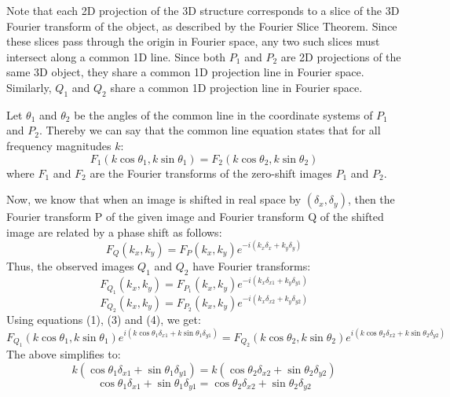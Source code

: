 \documentclass{article}
\begin{document}
\begin{enumerate}
Note that each 2D projection of the 3D structure corresponds to a slice of the 3D Fourier transform of the object, as described by the Fourier Slice Theorem. Since these slices pass through the origin in Fourier space, any two such slices must intersect along a common 1D line.
Since both $P_1$ and $P_2$ are 2D projections of the same 3D object, they share a common 1D projection line in Fourier space. Similarly, $Q_1$ and $Q_2$ share a common 1D projection line in Fourier space.


Let $\theta_1$ and $\theta_2$ be the angles of the common line in the coordinate systems of $P_1$ and $P_2$. Thereby we can say that the common line equation states that for all frequency magnitudes $k$:
\begin{equation}
    F_1(k \cos\theta_1, k \sin\theta_1) = F_2(k \cos\theta_2, k \sin\theta_2)
\end{equation}
where $F_1$ and $F_2$ are the Fourier transforms of the zero-shift images $P_1$ and $P_2$.

Now, we know that when an image is shifted in real space by $(\delta_x, \delta_y)$, then the Fourier transform P of the given image and Fourier transform Q of the shifted image are related by a phase shift as follows:
\begin{equation}
    F_Q(k_x, k_y) = F_P(k_x, k_y) e^{-i( k_x \delta_x + k_y \delta_y )}
\end{equation}
Thus, the observed images $Q_1$ and $Q_2$ have Fourier transforms:
\begin{equation}
    F_{Q_1}(k_x, k_y) = F_{P_1}(k_x, k_y) e^{-i (k_x \delta_{x1} + k_y \delta_{y1})}
\end{equation}
\begin{equation}
    F_{Q_2}(k_x, k_y) = F_{P_2}(k_x, k_y) e^{-i (k_x \delta_{x2} + k_y \delta_{y2})}
\end{equation}
Using equations (1), (3) and (4), we get:
\begin{equation}
    F_{Q_1}(k \cos\theta_1, k \sin\theta_1) e^{i ( k \cos\theta_1 \delta_{x1} + k \sin\theta_1 \delta_{y1} )} =
    F_{Q_2}(k \cos\theta_2, k \sin\theta_2) e^{i ( k \cos\theta_2 \delta_{x2} + k \sin\theta_2 \delta_{y2} )}
\end{equation}
The above simplifies to:
\begin{equation}
    k (\cos\theta_1 \delta_{x1} + \sin\theta_1 \delta_{y1}) = k (\cos\theta_2 \delta_{x2} + \sin\theta_2 \delta_{y2})
\end{equation}
\begin{equation}
    \cos\theta_1 \delta_{x1} + \sin\theta_1 \delta_{y1} = \cos\theta_2 \delta_{x2} + \sin\theta_2 \delta_{y2}
\end{equation}


\end{enumerate}
\end{document}
